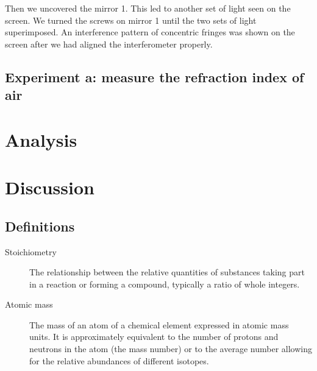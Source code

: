 \documentclass{article}
\begin{document}
Then we uncovered the mirror 1. This led to another set of light seen on the screen. We turned the screws on mirror 1 until the two sets of light superimposed. An interference pattern of concentric fringes was shown on the screen after we had aligned the interferometer properly. 

\subsection{Experiment a: measure the refraction index of air }



\section{Analysis}



\section{Discussion}

\subsection{Definitions}
\label{definitions}
\begin{description}
\item[Stoichiometry]
The relationship between the relative quantities of substances taking part in a reaction or forming a compound, typically a ratio of whole integers.
\item[Atomic mass]
The mass of an atom of a chemical element expressed in atomic mass units. It is approximately equivalent to the number of protons and neutrons in the atom (the mass number) or to the average number allowing for the relative abundances of different isotopes. 
\end{description} 
 
\end{document}
